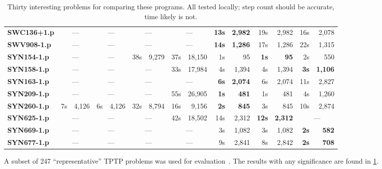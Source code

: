 \documentclass[11pt,twocolumn]{article}
\newcommand{\citen}[1]{~\parencite{#1}}
\newcommand{\winner}[1]{{\bfseries\color{ForestGreen}#1}}
\begin{document}
\begin{table}[t]
\begin{tabular}{>{\ttfamily\bfseries}l *{7}{rr}}
			\addlinespace
			SWC136+1.p & \multicolumn{2}{c}{---} & \multicolumn{2}{c}{---} & \multicolumn{2}{c}{---} & \multicolumn{2}{c}{---} & \winner{13s} & \winner{2,982} & 19s & 2,982 & 16s & 2,078 \\
			\addlinespace
			SWV908-1.p & \multicolumn{2}{c}{---} & \multicolumn{2}{c}{---} & \multicolumn{2}{c}{---} & \multicolumn{2}{c}{---} & \winner{14s} & \winner{1,286} & 17s & 1,286 & 22s & 1,315 \\
			\addlinespace
			SYN154-1.p & \multicolumn{2}{c}{---} & \multicolumn{2}{c}{---} & 38s & 9,279 & 37s & 18,150 & 1s & 95 & \winner{1s} & \winner{95} & 2s & 550 \\
			SYN158-1.p & \multicolumn{2}{c}{---} & \multicolumn{2}{c}{---} & \multicolumn{2}{c}{---} & 33s & 17,984 & 4s & 1,394 & 4s & 1,394 & \winner{3s} & \winner{1,106} \\
			SYN163-1.p & \multicolumn{2}{c}{---} & \multicolumn{2}{c}{---} & \multicolumn{2}{c}{---} & \multicolumn{2}{c}{---} & \winner{6s} & \winner{2,074} & 6s & 2,074 & 11s & 2,827 \\
			SYN209-1.p & \multicolumn{2}{c}{---} & \multicolumn{2}{c}{---} & \multicolumn{2}{c}{---} & 55s & 26,905 & \winner{1s} & \winner{481} & 1s & 481 & 4s & 1,260 \\
			SYN260-1.p & 7s & 4,126 & 6s & 4,126 & 32s & 8,794 & 16s & 9,156 & \winner{2s} & \winner{845} & 3s & 845 & 10s & 2,874 \\
			SYN625-1.p & \multicolumn{2}{c}{---} & \multicolumn{2}{c}{---} & \multicolumn{2}{c}{---} & 42s & 18,502 & 14s & 2,312 & \winner{12s} & \winner{2,312} & \multicolumn{2}{c}{---} \\
			SYN669-1.p & \multicolumn{2}{c}{---} & \multicolumn{2}{c}{---} & \multicolumn{2}{c}{---} & \multicolumn{2}{c}{---} & 3s & 1,082 & 3s & 1,082 & \winner{2s} & \winner{582} \\
			SYN677-1.p & \multicolumn{2}{c}{---} & \multicolumn{2}{c}{---} & \multicolumn{2}{c}{---} & \multicolumn{2}{c}{---} & 9s & 2,841 & 8s & 2,842 & \winner{2s} & \winner{708} \\
		\bottomrule
	\end{tabular}
	\caption{Thirty interesting problems for comparing these programs. All tested locally; step count should be accurate, time likely is not.}
	\label{big_table}
\end{table}

A subset of 247 ``representative'' TPTP problems was used for evaluation\citen{chvalovsky2021characteristic}.
The results with any significance are found in \cref{big_table}.
\end{document}
